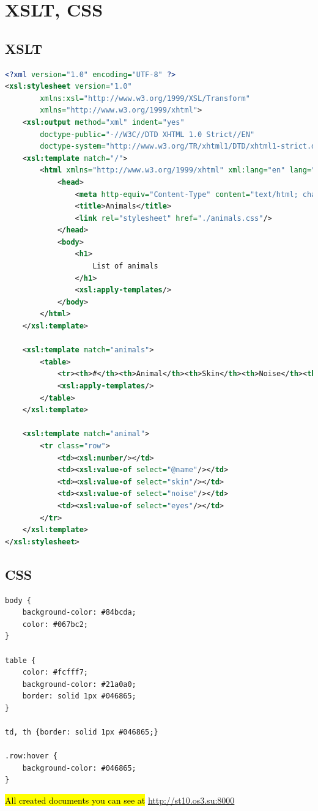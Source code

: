 \documentclass[a4paper,11pt]{article}
\theoremstyle{mytheor}
\begin{document}
\section{XSLT, CSS}
\addtocounter{subsection}{9}

\subsection{XSLT}
\begin{lstlisting}[language=xml]
<?xml version="1.0" encoding="UTF-8" ?>
<xsl:stylesheet version="1.0" 
        xmlns:xsl="http://www.w3.org/1999/XSL/Transform" 
        xmlns="http://www.w3.org/1999/xhtml">
    <xsl:output method="xml" indent="yes"
        doctype-public="-//W3C//DTD XHTML 1.0 Strict//EN" 
        doctype-system="http://www.w3.org/TR/xhtml1/DTD/xhtml1-strict.dtd"/>
    <xsl:template match="/">
        <html xmlns="http://www.w3.org/1999/xhtml" xml:lang="en" lang="en">
            <head>
                <meta http-equiv="Content-Type" content="text/html; charset=UTF-8" />
                <title>Animals</title>
                <link rel="stylesheet" href="./animals.css"/>
            </head>
            <body>
                <h1>
                    List of animals 
                </h1>
                <xsl:apply-templates/>
            </body>
        </html>
    </xsl:template>

    <xsl:template match="animals">
        <table>
            <tr><th>#</th><th>Animal</th><th>Skin</th><th>Noise</th><th>Eyes</th></tr>
            <xsl:apply-templates/>
        </table>
    </xsl:template>

    <xsl:template match="animal">
        <tr class="row">
            <td><xsl:number/></td>
            <td><xsl:value-of select="@name"/></td>
            <td><xsl:value-of select="skin"/></td>
            <td><xsl:value-of select="noise"/></td>
            <td><xsl:value-of select="eyes"/></td>
        </tr>
    </xsl:template>
</xsl:stylesheet>
\end{lstlisting}
\subsection{CSS}
\begin{lstlisting}
body {
    background-color: #84bcda;
    color: #067bc2;
}

table {
    color: #fcfff7;
    background-color: #21a0a0;
    border: solid 1px #046865;
}

td, th {border: solid 1px #046865;}

.row:hover {
    background-color: #046865;
}
\end{lstlisting}

\hl{All created documents you can see at} \href{http://st10.os3.su:8000}{http://st10.os3.su:8000}
\end{document}
